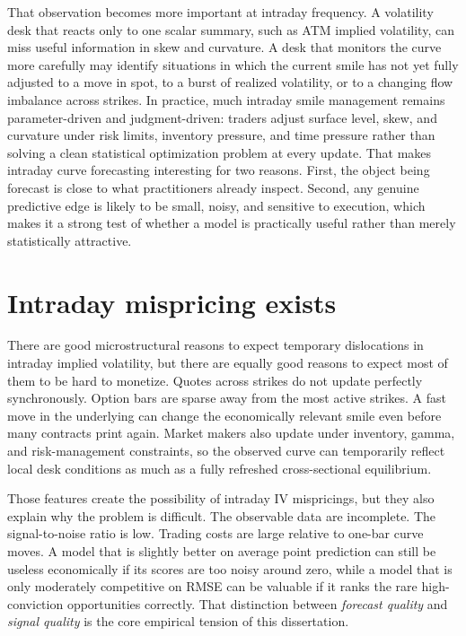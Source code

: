 \documentclass[12pt]{report}
\begin{document}
That observation becomes more important at intraday frequency. A volatility desk that reacts only to one scalar summary, such as ATM implied volatility, can miss useful information in skew and curvature. A desk that monitors the curve more carefully may identify situations in which the current smile has not yet fully adjusted to a move in spot, to a burst of realized volatility, or to a changing flow imbalance across strikes. In practice, much intraday smile management remains parameter-driven and judgment-driven: traders adjust surface level, skew, and curvature under risk limits, inventory pressure, and time pressure rather than solving a clean statistical optimization problem at every update. That makes intraday curve forecasting interesting for two reasons. First, the object being forecast is close to what practitioners already inspect. Second, any genuine predictive edge is likely to be small, noisy, and sensitive to execution, which makes it a strong test of whether a model is practically useful rather than merely statistically attractive.

\section{Intraday mispricing exists}
There are good microstructural reasons to expect temporary dislocations in intraday implied volatility, but there are equally good reasons to expect most of them to be hard to monetize. Quotes across strikes do not update perfectly synchronously. Option bars are sparse away from the most active strikes. A fast move in the underlying can change the economically relevant smile even before many contracts print again. Market makers also update under inventory, gamma, and risk-management constraints, so the observed curve can temporarily reflect local desk conditions as much as a fully refreshed cross-sectional equilibrium.

Those features create the possibility of intraday IV mispricings, but they also explain why the problem is difficult. The observable data are incomplete. The signal-to-noise ratio is low. Trading costs are large relative to one-bar curve moves. A model that is slightly better on average point prediction can still be useless economically if its scores are too noisy around zero, while a model that is only moderately competitive on RMSE can be valuable if it ranks the rare high-conviction opportunities correctly. That distinction between \emph{forecast quality} and \emph{signal quality} is the core empirical tension of this dissertation.
\end{document}
